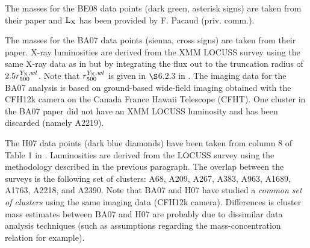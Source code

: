 \documentclass[12pt]{emulateapj}
\newcommand{\lx}{$\rm{L}_{\rm X}$ }
\begin{document}
The masses for the BE08 data points (dark green, asterisk signs) are
taken from their paper and \lx has been provided by F. Pacaud
(priv. comm.).

The masses for the BA07 data points (sienna, cross signs) are taken
from their paper. X-ray luminosities are derived from the XMM LOCUSS
survey using the same X-ray data as in \citet{Zhang:2008} but by
integrating the flux out to the truncation radius of $2.5
r_{500}^{Y_{\rm X}, wl}$. Note that $r_{500}^{Y_{\rm X}, wl}$ is given
in $\S$6.2.3 in \citet{Zhang:2008}. The imaging data for the BA07
analysis is based on ground-based wide-field imaging obtained with the
CFH12k camera on the Canada France Hawaii Telescope (CFHT). One
cluster in the BA07 paper did not have an XMM LOCUSS luminosity and
has been discarded (namely A2219).

The H07 data points (dark blue diamonds) have been taken from column 8
of Table 1 in \citet{Mahdavi:2008}. Luminosities are derived from the
LOCUSS survey using the methodology described in the previous
paragraph. The overlap between the surveys is the following set of
clusters: A68, A209, A267, A383, A963, A1689, A1763, A2218, and
A2390. Note that BA07 and H07 have studied a {\em common set of
  clusters} using the same imaging data (CFH12k camera). Differences
is cluster mass estimates between BA07 and H07 are probably due to
dissimilar data analysis techniques (such as assumptions regarding the
mass-concentration relation for example).
\end{document}

